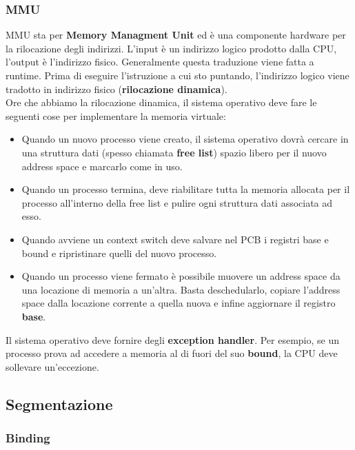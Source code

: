\documentclass[12pt, letterpaper]{article}
\begin{document}
			\subsubsection{MMU}
				MMU sta per \textbf{Memory Managment Unit} ed è una componente hardware per la rilocazione degli indirizzi. L'input è un indirizzo logico prodotto dalla CPU, l'output è l'indirizzo fisico. Generalmente questa traduzione viene fatta a runtime. Prima di eseguire l'istruzione a cui sto puntando, l'indirizzo logico viene tradotto in indirizzo fisico (\textbf{rilocazione dinamica}).\\
				Ore che abbiamo la rilocazione dinamica, il sistema operativo deve fare le seguenti cose per implementare la memoria virtuale: 
				\begin{itemize}
					\item Quando un nuovo processo viene creato, il sistema operativo dovrà cercare in una struttura dati (spesso chiamata \textbf{free list}) spazio libero per il nuovo address space e marcarlo come in uso.
					\item Quando un processo termina, deve riabilitare tutta la memoria allocata per il processo all'interno della free list e pulire ogni struttura dati associata ad esso.
					\item Quando avviene un context switch deve salvare nel PCB i registri base e bound e ripristinare quelli del nuovo processo. 
					\item Quando un processo viene fermato è possibile muovere un address space da una locazione di memoria a un'altra. Basta deschedularlo, copiare l'address space dalla locazione corrente a quella nuova e infine aggiornare il registro \textbf{base}.
				\end{itemize}
				
				Il sistema operativo deve fornire degli \textbf{exception handler}. Per esempio, se un processo prova ad accedere a memoria al di fuori del suo \textbf{bound}, la CPU deve sollevare un'eccezione. 
				
		\subsection{Segmentazione}
			
			\subsubsection{Binding}
				
\end{document}
